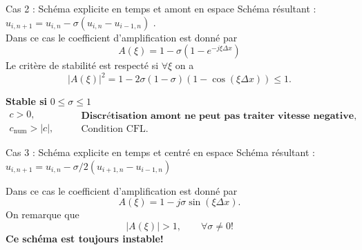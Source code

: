 \documentclass[aspectratio=169, french]{beamer}
\begin{document}
\begin{frame}{Cas 2 : Schéma explicite en temps et amont en espace}
	Schéma résultant : 
	$u_{i, n+1} = u_{i, n} - \sigma(u_{i, n} - u_{i-1, n})$ . \\
	Dans ce cas le coefficient d'amplification est donné par
	\begin{equation*}
		A(\xi) = 1 - \sigma(1- e^{-j  \xi \Delta x})
	\end{equation*}
	Le critère de stabilité est respecté si $\forall \xi$ on a
	\begin{equation*}
		|A(\xi)|^2 = 1 - 2 \sigma(1-\sigma)(1 - \cos(\xi \Delta x))\le 1.
	\end{equation*}
	
	\begin{tcolorbox}[title=Conditions de stabilité, coltitle=white]
	\textbf{Stable si }   $0 \le \sigma \le 1$
	\begin{equation*}
		\begin{aligned}
			c>0, \\
			c_{\mathrm{num}}>|c|, 
		\end{aligned}
		\qquad 
		\begin{aligned}
			\textbf{Discrétisation amont ne peut pas traiter vitesse negative}, \\
			\text{Condition CFL.}
		\end{aligned}
	\end{equation*}
		
	\end{tcolorbox}
	
\end{frame}


\begin{frame}{Cas 3 : Schéma explicite en temps et centré en espace}
	Schéma résultant : 
	$u_{i, n+1} = u_{i, n} - \sigma/2(u_{i+1, n} - u_{i-1, n})$ 
	
	\begin{tcolorbox}
		Dans ce cas le coefficient d'amplification est donné par
		\begin{equation*}
			A(\xi) = 1 - j\sigma\sin(\xi \Delta x).
		\end{equation*}
		On remarque que
		\begin{equation*}
			|A(\xi)| > 1, \qquad \forall \sigma \ne 0!
		\end{equation*}
	\textbf{Ce schéma est toujours instable!}
		
	\end{tcolorbox}
	
\end{frame}
\end{document}
